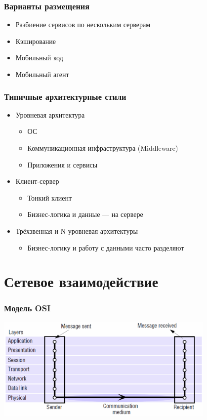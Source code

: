 \documentclass[xetex,mathserif,serif]{beamer}
\begin{document}
	\begin{frame}
		\frametitle{Варианты размещения}
		\begin{itemize}
			\item Разбиение сервисов по нескольким серверам
			\item Кэширование
			\item Мобильный код
			\item Мобильный агент
		\end{itemize}
	\end{frame}

	\begin{frame}
		\frametitle{Типичные архитектурные стили}
		\begin{itemize}
			\item Уровневая архитектура
			\begin{itemize}
				\item ОС
				\item Коммуникационная инфраструктура (Middleware)
				\item Приложения и сервисы
			\end{itemize}
			\item Клиент-сервер
			\begin{itemize}
				\item Тонкий клиент
				\item Бизнес-логика и данные --- на сервере
			\end{itemize}
			\item Трёхзвенная и N-уровневая архитектуры
			\begin{itemize}
				\item Бизнес-логику и работу с данными часто разделяют
			\end{itemize}
		\end{itemize}
	\end{frame}

	\section{Сетевое взаимодействие}

	\begin{frame}
		\frametitle{Модель OSI}
		\begin{center}
			\includegraphics[width=0.8\textwidth]{osiStack.png}
		\end{center}
	\end{frame}
\end{document}
